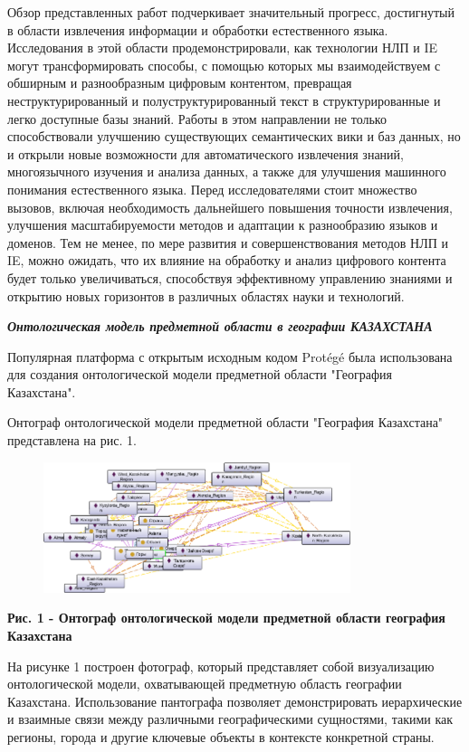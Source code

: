 Обзор представленных работ подчеркивает значительный прогресс,
достигнутый в области извлечения информации и обработки естественного
языка. Исследования в этой области продемонстрировали, как технологии
НЛП и IE могут трансформировать способы, с помощью которых мы
взаимодействуем с обширным и разнообразным цифровым контентом, превращая
неструктурированный и полуструктурированный текст в структурированные и
легко доступные базы знаний. Работы в этом направлении не только
способствовали улучшению существующих семантических вики и баз данных,
но и открыли новые возможности для автоматического извлечения знаний,
многоязычного изучения и анализа данных, а также для улучшения машинного
понимания естественного языка. Перед исследователями стоит множество
вызовов, включая необходимость дальнейшего повышения точности
извлечения, улучшения масштабируемости методов и адаптации к
разнообразию языков и доменов. Тем не менее, по мере развития и
совершенствования методов НЛП и IE, можно ожидать, что их влияние на
обработку и анализ цифрового контента будет только увеличиваться,
способствуя эффективному управлению знаниями и открытию новых горизонтов
в различных областях науки и технологий.

\emph{\textbf{Онтологическая модель предметной области в географии
КАЗАХСТАНА}}

Популярная платформа с открытым исходным кодом Protégé была использована
для создания онтологической модели предметной области "География
Казахстана".

Онтограф онтологической модели предметной области "География Казахстана"
представлена на рис. 1.

\begin{figure}[H]
	\centering
	\includegraphics[width=0.8\textwidth]{assets/38}
	\caption*{}
\end{figure}

\textbf{Рис. 1 - Онтограф онтологической модели предметной области
география Казахстана}

На рисунке 1 построен фотограф, который представляет собой визуализацию
онтологической модели, охватывающей предметную область географии
Казахстана. Использование пантографа позволяет демонстрировать
иерархические и взаимные связи между различными географическими
сущностями, такими как регионы, города и другие ключевые объекты в
контексте конкретной страны.

